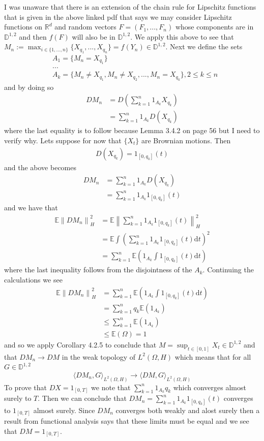\documentclass[a4paper,11pt]{article}
\numberwithin{equation}{section}
\theoremstyle{plain}
\theoremstyle{definition}
\newcommand{\ud}{\ensuremath{\mathrm{d}}}
\newcommand{\Norm}[1]{\left\|  #1   \right\|}
\newcommand{\R}{\mathbb{R}}
\numberwithin{NQ}{section}
\numberwithin{LQ}{section}
\numberwithin{ZQ}{section}
\begin{document}
I was unaware that there is an extension of the chain rule for Lipschitz functions that is given in the above linked pdf that says we may consider Lipschitz functions on $\R^d$ and random vectors $F=(F_1,...,F_n)$ whose components are in $\mathbb {D}^{1,2}$ and then $f(F)$ will also be in $\mathbb {D}^{1,2}$. We apply this above to see that $M_n:= \max_{i\in \{1,...,n\}}\{X_{q_1},..., X_{q_n}\} = f(Y_n) \in\mathbb {D}^{1,2} $. Next we define the sets 
\begin{align*}
	&A_1 = \{M_n = X_{q_1}\}
	\\ &...
	\\ & A_k = \{M_n \not= X_{q_1}, M_n \not= X_{q_2},...,M_n= X_{q_k}\}, 2 \le k \le n
\end{align*}
and by doing so 
\begin{align*}
DM_n &= D\left(\sum_{k=1}^n1_{A_k}X_{q_k}\right)
\\&= \sum_{k=1}^n1_{A_k}D\left(X_{q_k}\right)
\end{align*}
where the last equality is to follow because Lemma 3.4.2 on page 56 but I need to verify why. Lets suppose for now that $\{X_t\}$ are Brownian motions. Then 
\begin{align} \label{brown}
	D\left(X_{q_k}\right) = 1_{[0,q_k]}(t)
\end{align}
and the above becomes 
\begin{align*}
	DM_n &= \sum_{k=1}^n1_{A_k}D\left(X_{q_k}\right)
	\\ & = \sum_{k=1}^n1_{A_k}1_{[0,q_k]}(t)
\end{align*}
and we have that 
\begin{align*}
	\mathbb{E}\Norm{DM_n}_H^2 &= \mathbb{E}\Norm{\sum_{k=1}^n1_{A_k}1_{[0,q_k]}(t)}_H^2
	\\& = \mathbb{E} \int \left( \sum_{k=1}^n1_{A_k}1_{[0,q_k]}(t) \ud t \right)^2
	\\& = \sum_{k=1}^n  \mathbb{E}\left(1_{A_k}\int1_{[0,q_k]}(t) \ud t\right)
\end{align*}
where the last inequality follows from the disjointness of the $A_k$. Continuing the calculations we see 
\begin{align*}
\mathbb{E}\Norm{DM_n}_H^2 &= \sum_{k=1}^n  \mathbb{E}\left(1_{A_k}\int1_{[0,q_k]}(t) \ud t\right)
\\& = \sum_{k=1}^n  q_k \mathbb{E}\left(1_{A_k}\right)
\\& \le \sum_{k=1}^n  \mathbb{E}\left(1_{A_k}\right)
\\& \le \mathbb{E}\left(\Omega \right) =1
\end{align*}
and so we apply Corollary 4.2.5 to conclude that $M=\sup_{t \in [0,1]}X_t \in \mathbb{D}^{1,2}$ and that $DM_n \to DM$ in the weak topology of $L^2(\Omega,H)$ which means that for all $G\in \mathbb{D}^{1,2}$
\[
\langle DM_n,G \rangle_{L^2(\Omega,H)} \to \langle DM,G\rangle_{L^2(\Omega,H)}
\]
To prove that $DX=1_{[0,T]}$ we note that $\sum_{k=1}^n1_{A_k}q_k$ which converges almost surely to $T$. Then we can conclude that $DM_n  = \sum_{k=1}^n1_{A_k}1_{[0,q_k]}(t)$ converges to $1_{[0,T]}$ almost surely. Since $DM_n$ converges both weakly and alost surely then a result from functional analysis says that these limits must be equal and we see that $DM=1_{[0,T]}$. 
\end{document}
